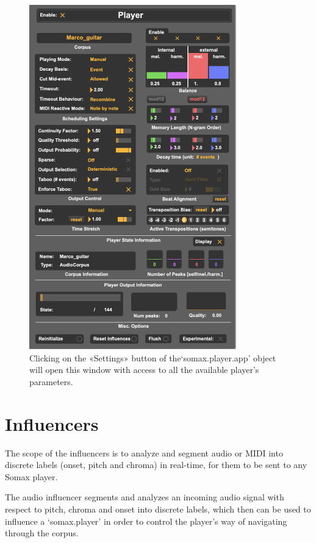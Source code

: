  \begin{figure}[H]
    \centering        
 	\includegraphics[width=0.8\textwidth, keepaspectratio]{somax2-6-user-guide/img/playerui_2-6.png}
    \caption{Clicking on the «Settings» button of the`somax.player.app' object will open this window with access to all the available player's parameters.}
    \label{fig:player_settings}
\end{figure}

\clearpage

\section{Influencers}

The scope of the influencers is to analyze and segment audio or MIDI into discrete labels (onset, pitch and chroma) in real-time, for them to be sent to any Somax player.

The audio influencer segments and analyzes an incoming audio signal with respect to pitch, chroma and onset into discrete labels, which then can be used to influence a `somax.player' in order to control the player's way of navigating through the corpus.

